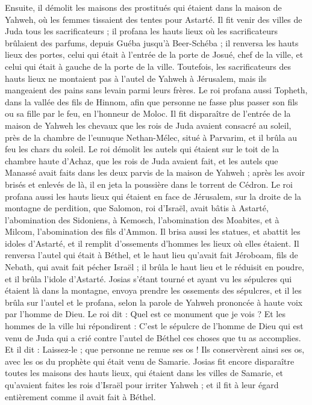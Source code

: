 \begin{multicols}{2}
Ensuite, il démolit les maisons des prostitués qui étaient dans la maison de Yahweh, où les femmes tissaient des tentes pour Astarté.
Il fit venir des villes de Juda tous les sacrificateurs ; il profana les hauts lieux où les sacrificateurs brûlaient des parfums, depuis Guéba jusqu’à Beer-Schéba ; il renversa les hauts lieux des portes, celui qui était à l’entrée de la porte de Josué, chef de la ville, et celui qui était à gauche de la porte de la ville.
Toutefois, les sacrificateurs des hauts lieux ne montaient pas à l’autel de Yahweh à Jérusalem, mais ils mangeaient des pains sans levain parmi leurs frères.
Le roi profana aussi Topheth, dans la vallée des fils de Hinnom, afin que personne ne fasse plus passer son fils ou sa fille par le feu, en l’honneur de Moloc.
Il fit disparaître de l’entrée de la maison de Yahweh les chevaux que les rois de Juda avaient consacré au soleil, près de la chambre de l’eunuque Nethan-Mélec, situé à Parvarim, et il brûla au feu les chars du soleil.
Le roi démolit les autels qui étaient sur le toit de la chambre haute d’Achaz, que les rois de Juda avaient fait, et les autels que Manassé avait faits dans les deux parvis de la maison de Yahweh ; après les avoir brisés et enlevés de là, il en jeta la poussière dans le torrent de Cédron.
Le roi profana aussi les hauts lieux qui étaient en face de Jérusalem, sur la droite de la montagne de perdition, que Salomon, roi d’Israël, avait bâtis à Astarté, l’abomination des Sidoniens, à Kemosch, l’abomination des Moabites, et à Milcom, l’abomination des fils d’Ammon.
Il brisa aussi les statues, et abattit les idoles d’Astarté, et il remplit d’ossements d’hommes les lieux où elles étaient.
Il renversa l’autel qui était à Béthel, et le haut lieu qu’avait fait Jéroboam, fils de Nebath, qui avait fait pécher Israël ; il brûla le haut lieu et le réduisit en poudre, et il brûla l’idole d’Astarté.
Josias s’étant tourné et ayant vu les sépulcres qui étaient là dans la montagne, envoya prendre les ossements des sépulcres, et il les brûla sur l’autel et le profana, selon la parole de Yahweh prononcée à haute voix par l’homme de Dieu.
Le roi dit : Quel est ce monument que je vois ? Et les hommes de la ville lui répondirent : C’est le sépulcre de l’homme de Dieu qui est venu de Juda qui a crié contre l’autel de Béthel ces choses que tu as accomplies.
Et il dit : Laissez-le ; que personne ne remue ses os ! Ils conservèrent ainsi ses os, avec les os du prophète qui était venu de Samarie.
Josias fit encore disparaître toutes les maisons des hauts lieux, qui étaient dans les villes de Samarie, et qu’avaient faites les rois d’Israël pour irriter Yahweh ; et il fit à leur égard entièrement comme il avait fait à Béthel.

\end{multicols}
